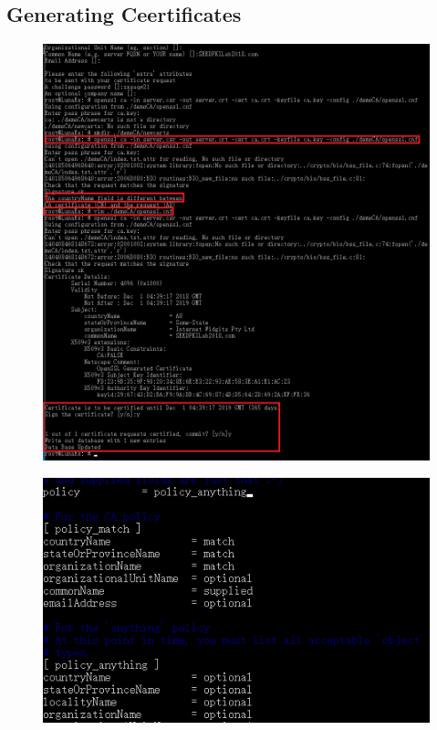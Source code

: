 \documentclass{article}
\begin{document}
\subsection{Generating Ceertificates}
\begin{figure}[H]\centering\includegraphics[width=\textwidth]{2-4.png}\end{figure}
\begin{figure}[H]\centering\includegraphics{2-3.png}\end{figure}
\end{document}
